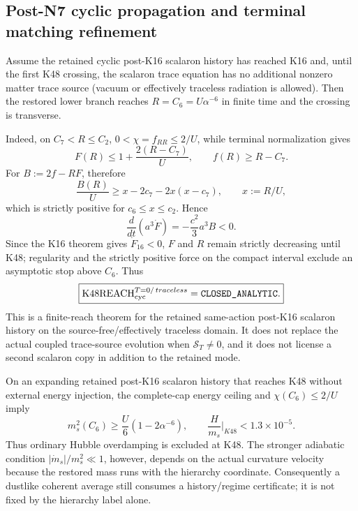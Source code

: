 \documentclass[12pt,a4paper]{article}
\begin{document}
\subsection{Post-N7 cyclic propagation and terminal matching refinement}
\label{p8:sec:v2115-post-n7-downstream}

\begin{theorem}
\label{p8:thm:v2115-k48-traceless-reach}
Assume the retained cyclic post-K16 scalaron history has reached K16 and,
until the first K48 crossing, the scalaron trace equation has no additional nonzero matter
trace source (vacuum or effectively traceless radiation is allowed).  Then the
restored lower branch reaches
\(R=C_6=U\alpha^{-6}\) in finite time and the crossing is transverse.

Indeed, on \(C_7<R\le C_2\),
\(0<\chi=f_{RR}\le2/U\), while terminal normalization gives
\[
 F(R)\le1+\frac{2(R-C_7)}U,
 \qquad f(R)\ge R-C_7.
\]
For \(B:=2f-RF\), therefore
\[
 \frac{B(R)}U\ge x-2c_7-2x(x-c_7),
 \qquad x:=R/U,
\]
which is strictly positive for \(c_6\le x\le c_2\).  Hence
\[
 \frac{d}{dt}(a^3\dot F)=-\frac{c^2}{3}a^3B<0.
\]
Since the K16 theorem gives \(\dot F_{16}<0\), \(F\) and \(R\) remain
strictly decreasing until K48; regularity and the strictly positive force on
the compact interval exclude an asymptotic stop above \(C_6\).  Thus
\[
 \boxed{\mathrm{K48REACH}_{\rm cyc}^{T=0/\,traceless}
 =\texttt{CLOSED\_ANALYTIC}.}
\]
This is a finite-reach theorem for the retained same-action post-K16 scalaron
history on the source-free/effectively traceless domain.  It does not replace
the actual coupled trace-source evolution when \(\mathcal S_T\neq0\), and it
does not license a second scalaron copy in addition to the retained mode.
\end{theorem}

\begin{corollary}
\label{p8:cor:v2115-k48-underdamped-bound}
On an expanding retained post-K16 scalaron history that reaches K48
without external energy injection, the complete-cap energy ceiling and
\(\chi(C_6)\le2/U\) imply
\[
 m_s^2(C_6)\ge\frac{U}{6}(1-2\alpha^{-6}),
 \qquad
 \boxed{\frac{H}{m_s}\Big|_{K48}<1.3\times10^{-5}.}
\]
Thus ordinary Hubble overdamping is excluded at K48.  The stronger adiabatic
condition \(|\dot m_s|/m_s^2\ll1\), however, depends on the actual curvature
velocity because the restored mass runs with the hierarchy coordinate.
Consequently a dustlike coherent average still consumes a history/regime
certificate; it is not fixed by the hierarchy label alone.
\end{corollary}
\end{document}
